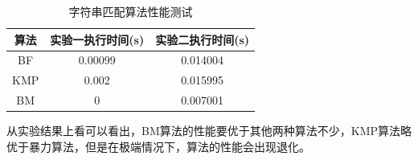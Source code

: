 \documentclass[UTF8]{ctexart}
\begin{document}
\begin{table}[H]
    \caption{字符串匹配算法性能测试}
    \label{table-1}
    \begin{center}
        \begin{tabular}{ccc}
            \hline
            算法&       实验一执行时间(s) &     实验二执行时间(s)\\     
            \hline
            BF&         0.00099 &           0.014004  \\  
            KMP&        0.002 &             0.015995  \\ 
            BM&         0 &                 0.007001  \\                     
            \hline
        \end{tabular}  
    \end{center}
\end{table}

从实验结果上看可以看出，BM算法的性能要优于其他两种算法不少，KMP算法略优于暴力算法，但是在极端情况下，算法的性能会出现退化。
\end{document}
